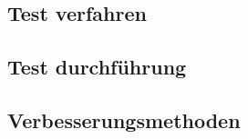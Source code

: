 
\subsection{Test verfahren}\label{subsec:Test verfahren}






\subsection{Test durchführung}\label{subsec:Test durchführung}


\subsection{Verbesserungsmethoden}\label{subsec:Verbesserungsmethoden}




